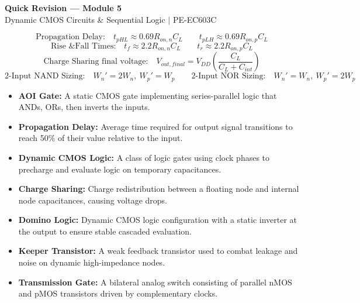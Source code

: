 \documentclass[12pt,a4paper]{article}
\begin{document}
\newpage
\begin{center}
  {\large\bfseries\color{myred} Quick Revision --- Module 5}\\[3pt]
  {\small\color{mydark} Dynamic CMOS Circuits \& Sequential Logic $|$ PE-EC603C}
\end{center}
\noindent{\color{myred}\rule{\linewidth}{1.2pt}}
\vspace{4pt}

\begin{tcolorbox}[formulabox, title={\textbf{Key Equations}}]
$$\text{Propagation Delay:} \quad t_{pHL} \approx 0.69 R_{on,n} C_L \qquad t_{pLH} \approx 0.69 R_{on,p} C_L$$
$$\text{Rise \& Fall Times:} \quad t_f \approx 2.2 R_{on,n} C_L \qquad t_r \approx 2.2 R_{on,p} C_L$$
$$\text{Charge Sharing final voltage:} \quad V_{out,final} = V_{DD} \left( \frac{C_L}{C_L + C_{int}} \right)$$
$$\text{2-Input NAND Sizing:} \quad W_n' = 2W_n, \ W_p' = W_p \qquad \text{2-Input NOR Sizing:} \quad W_n' = W_n, \ W_p' = 2W_p$$
\end{tcolorbox}

\begin{tcolorbox}[defbox, title={\textbf{One-Line Definitions}}]
\begin{itemize}[leftmargin=*, itemsep=2.5pt, topsep=0pt]
  \item \textbf{AOI Gate:} A static CMOS gate implementing series-parallel logic that ANDs, ORs, then inverts the inputs.
  \item \textbf{Propagation Delay:} Average time required for output signal transitions to reach 50\% of their value relative to the input.
  \item \textbf{Dynamic CMOS Logic:} A class of logic gates using clock phases to precharge and evaluate logic on temporary capacitances.
  \item \textbf{Charge Sharing:} Charge redistribution between a floating node and internal node capacitances, causing voltage drops.
  \item \textbf{Domino Logic:} Dynamic CMOS logic configuration with a static inverter at the output to ensure stable cascaded evaluation.
  \item \textbf{Keeper Transistor:} A weak feedback transistor used to combat leakage and noise on dynamic high-impedance nodes.
  \item \textbf{Transmission Gate:} A bilateral analog switch consisting of parallel nMOS and pMOS transistors driven by complementary clocks.
\end{itemize}
\end{tcolorbox}
\end{document}
